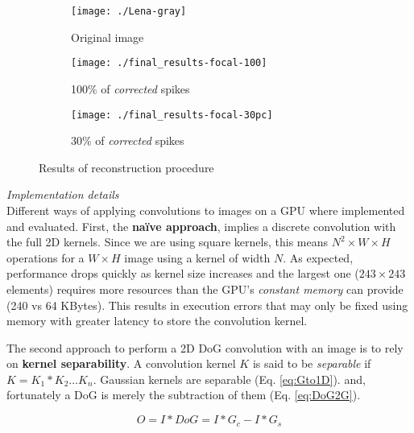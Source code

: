 \begin{figure}[hbt]
  \centering
  \begin{subfigure}[t]{0.3\textwidth}
    \centering
    \captionsetup{justification=centering,margin=0.1cm}
    \texttt{[image: ./Lena-gray]}
    \caption{Original image}
    \label{pic-original-lena}
  \end{subfigure}
  \begin{subfigure}[t]{0.3\textwidth}
    \centering
    \captionsetup{justification=centering,margin=0.1cm}
    \texttt{[image: ./final\_results-focal-100]}
    \caption{100\% of \emph{corrected} spikes}
    \label{pic-100pc-spikes}
  \end{subfigure}
  \begin{subfigure}[t]{0.3\textwidth}
    \centering
    \captionsetup{justification=centering,margin=0.1cm}
    \texttt{[image: ./final\_results-focal-30pc]}
    \caption{30\% of \emph{corrected} spikes}
    \label{pic-30pc-spikes}
  \end{subfigure}
  \caption{Results of reconstruction procedure}
  \label{fig-reconstruction}
  \vspace*{-10pt}
\end{figure}



\emph{Implementation details}\\
Different ways of applying convolutions to images on a GPU where implemented and evaluated. First, the \textbf{naïve approach}, implies a discrete convolution with the full 2D kernels. Since we are using square kernels, this means $N^2 \times W \times H$ operations for a $W\times H$ image using a kernel of width $N$. As expected, performance drops quickly as kernel size increases and the largest one ($243\times243$ elements) requires more resources than the GPU's \emph{constant memory} can provide (240 vs 64 KBytes). This results in execution errors that may only be fixed using memory with greater latency to store the convolution kernel. 


The second approach to perform a 2D DoG convolution with an image is to rely on \textbf{kernel separability}. A convolution kernel $K$ is said to be \emph{separable} if $K = K_{1} \ast K_{2} \dots K_{n}$. Gaussian kernels are separable (Eq. \ref{eq:Gto1D}). and, fortunately a DoG is merely the subtraction of them (Eq. \ref{eq:DoG2G}).

\begin{equation}
O = I \ast DoG = I \ast G_{c} - I \ast G_{s}
\label{eq:DoG2G}
\end{equation}

